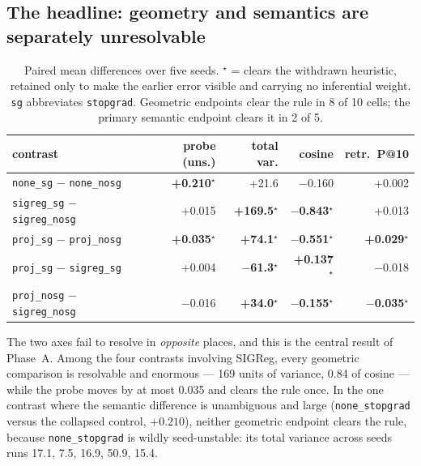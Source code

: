 \subsection{The headline: geometry and semantics are separately unresolvable}

\begin{table}[h]
\centering
\small
\begin{tabular}{l r r r r}
\toprule
\textbf{contrast} & \textbf{probe (uns.)} & \textbf{total var.} & \textbf{cosine} & \textbf{retr.\ P@10} \\
\midrule
\texttt{none\_sg} $-$ \texttt{none\_nosg}       & \textbf{+0.210}$^\star$ & +21.6  & $-$0.160 & +0.002 \\
\texttt{sigreg\_sg} $-$ \texttt{sigreg\_nosg}   & +0.015  & \textbf{+169.5}$^\star$ & \textbf{$-$0.843}$^\star$ & +0.013 \\
\texttt{proj\_sg} $-$ \texttt{proj\_nosg}       & \textbf{+0.035}$^\star$ & \textbf{+74.1}$^\star$  & \textbf{$-$0.551}$^\star$ & \textbf{+0.029}$^\star$ \\
\texttt{proj\_sg} $-$ \texttt{sigreg\_sg}       & +0.004  & \textbf{$-$61.3}$^\star$  & \textbf{+0.137}$^\star$  & $-$0.018 \\
\texttt{proj\_nosg} $-$ \texttt{sigreg\_nosg}   & $-$0.016 & \textbf{+34.0}$^\star$   & \textbf{$-$0.155}$^\star$ & \textbf{$-$0.035}$^\star$ \\
\bottomrule
\end{tabular}
\caption{\ours{} Paired mean differences over five seeds. $^\star$ = clears the
withdrawn heuristic, retained only to make the earlier error visible and carrying no
inferential weight. \texttt{sg} abbreviates \texttt{stopgrad}. Geometric endpoints
clear the rule in 8 of 10 cells; the primary semantic endpoint clears it in 2 of 5.}
\label{tab:phasea}
\end{table}

\ours{} The two axes fail to resolve in \emph{opposite} places, and this is the central
result of Phase~A. Among the four contrasts involving SIGReg, every geometric comparison is
resolvable and enormous --- 169 units of variance, 0.84 of cosine --- while the probe moves
by at most 0.035 and clears the rule once. In the one contrast where the semantic difference
is unambiguous and large (\texttt{none\_stopgrad} versus the collapsed control, $+0.210$),
neither geometric endpoint clears the rule, because \texttt{none\_stopgrad} is wildly
seed-unstable: its total variance across seeds runs 17.1, 7.5, 16.9, 50.9, 15.4.

